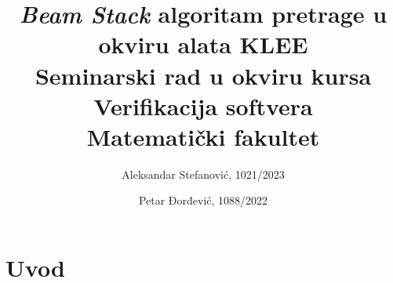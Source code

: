\documentclass[a4paper]{article}
\title{\textit{Beam Stack} algoritam pretrage u okviru alata KLEE\\ \small{Seminarski rad u okviru kursa\\Verifikacija softvera\\Matematički fakultet}}
\author{Aleksandar Stefanović, 1021/2023 \and Petar Đorđević, 1088/2022}
\begin{document}
\maketitle

\begin{abstract}

\end{abstract}

\tableofcontents

\newpage

\section{Uvod}

\appendix


\end{document}
